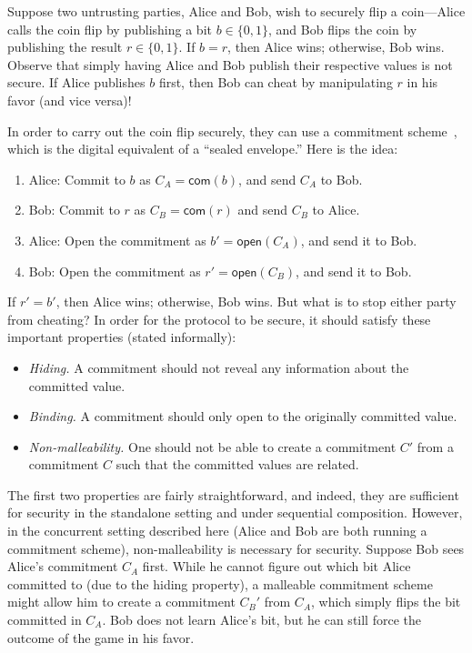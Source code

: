  Suppose two untrusting parties, Alice
and Bob, wish to securely flip a coin---Alice calls the coin flip by publishing a
bit $b \in \{ 0, 1\}$, and Bob flips the coin by publishing the result $r \in \{0,
1\}$. If $b = r$, then Alice wins; otherwise, Bob wins. Observe that simply
having Alice and Bob publish their respective values is not secure. If Alice
publishes $b$ first, then Bob can cheat by manipulating $r$ in his favor (and
vice versa)!

In order to carry out the coin flip securely, they can use a commitment
scheme~\cite{brassard1988minimum}, which is the digital equivalent of a ``sealed
envelope.'' Here is the idea:
\begin{enumerate}[leftmargin=*]
\item Alice: Commit to $b$ as $C_A = \mathsf{com}(b)$, and send $C_A$ to Bob.
\item Bob: Commit to $r$ as $C_B = \mathsf{com}(r)$  and send $C_B$ to Alice.
\item Alice: Open the commitment as $b' = \mathsf{open}(C_A)$, and send it to Bob.
\item Bob: Open the commitment as $r' = \mathsf{open}(C_B)$, and send it to Bob.
\end{enumerate}
\noindent If $r' = b'$, then Alice wins; otherwise, Bob wins. But what is to stop
either party from cheating? In order for the protocol to be secure, it should
satisfy these important properties (stated informally):
\begin{itemize}[leftmargin=*]
  \item \emph{Hiding.} A commitment should not reveal any information about the
    committed value.
  \item \emph{Binding.} A commitment should only open to the originally
    committed value.
  \item \emph{Non-malleability.} One should not be able to create a commitment
    $C'$ from a commitment $C$ such that the committed values are related.
\end{itemize}

The first two properties are fairly straightforward, and indeed, they are
sufficient for security in the standalone setting and under sequential
composition. However, in the concurrent setting described here (Alice and Bob
are both running a commitment scheme), non-malleability is necessary for
security. Suppose Bob sees Alice's commitment $C_A$ first. While he cannot
figure out which bit Alice committed to (due to the hiding property), a
malleable commitment scheme might allow him to create a commitment $C_B'$ from
$C_A$, which simply flips the bit committed in $C_A$. Bob does not learn Alice's
bit, but he can still force the outcome of the game in his favor.\smallskip

